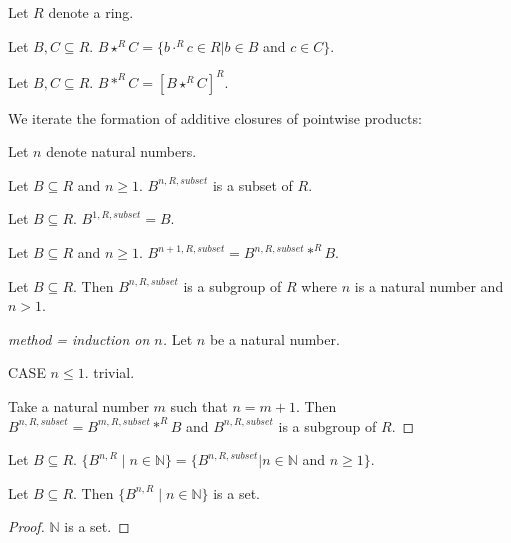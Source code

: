 \documentclass[english,11pt]{article}
\newcommand{\Powers}[2]{\{{#1}^{n,#2} \mid n \in \mathbb{N}\}}
\begin{document}
\begin{forthel}

Let $R$ denote a ring.

\begin{definition}
Let $B,C \subseteq R$.
$B \star^{R} C = \{b \cdot^{R} c \in R | b \in B$ and $c \in C\}$.
\end{definition} 

\begin{definition}
Let $B,C \subseteq R$. 
$B \ast^{R} C = [B \star^{R} C]^{R}$.
\end{definition}

\end{forthel}
We iterate the formation of additive closures of pointwise products:
\begin{forthel}

Let $n$ denote natural numbers.

\begin{signature}
Let $B \subseteq R$ and $n \geq 1$.
$B^{n,R,subset}$ is a subset of $R$.
\end{signature}

\begin{axiom}
Let $B \subseteq R$. $B^{1,R,subset} = B$.
\end{axiom}

\begin{axiom}
Let $B \subseteq R$ and $n \geq 1$.
$B^{n+1,R,subset} = B^{n,R,subset} \ast^{R} B$. 
\end{axiom}

\begin{lemma}
Let $B \subseteq R$. Then
$B^{n,R,subset}$ is a subgroup of $R$ 
where $n$ is a natural number and $n > 1$.
\end{lemma}
\begin{proof}[method = induction on $n$]

Let $n$ be a natural number.

CASE $n \leq 1$. trivial.

Take a natural number $m$ such that $n = m + 1$.
Then $B^{n,R,subset} = B^{m,R,subset} \ast^{R} B$ and
$B^{n,R,subset}$ is a subgroup of $R$.
\end{proof}


\begin{definition} Let $B \subseteq R$.
$\Powers{B}{R} = \{B^{n,R,subset} | n \in \mathbb{N}$ and $n \geq 1\} $.
\end{definition}

\begin{lemma}
Let $B \subseteq R$. Then $\Powers{B}{R}$ is a set.
\end{lemma}
\begin{proof} $\mathbb{N}$ is a set.
\end{proof}

\end{forthel}
\end{document}
